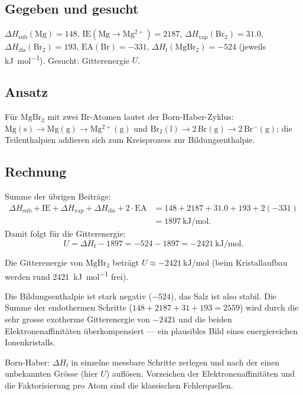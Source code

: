 
\subsection*{Gegeben und gesucht}
$\Delta H_{\mathrm{sub}}(\mathrm{Mg})=148$, $\mathrm{IE}(\mathrm{Mg\to Mg^{2+}})=2187$,
$\Delta H_{\mathrm{vap}}(\mathrm{Br_2})=31.0$, $\Delta H_{\mathrm{dis}}(\mathrm{Br_2})=193$,
$\mathrm{EA}(\mathrm{Br})=-331$, $\Delta H_{\mathrm f}(\mathrm{MgBr_2})=-524$
(jeweils \si{\kilo\joule\per\mol}). Gesucht: Gitterenergie $U$.

\subsection*{Ansatz}
Für $\mathrm{MgBr_2}$ mit zwei $\mathrm{Br}$-Atomen lautet der Born-Haber-Zyklus:
$\mathrm{Mg(s)}\to\mathrm{Mg(g)}\to\mathrm{Mg^{2+}(g)}$ und
$\mathrm{Br_2(l)}\to 2\,\mathrm{Br(g)}\to 2\,\mathrm{Br^-(g)}$; die Teilenthalpien
addieren sich zum Kreisprozess zur Bildungsenthalpie.

\subsection*{Rechnung}
Summe der übrigen Beiträge:
\begin{align*}
  \Delta H_{\mathrm{sub}}+\mathrm{IE}+\Delta H_{\mathrm{vap}}+\Delta H_{\mathrm{dis}}+2\cdot\mathrm{EA}
  &= 148+2187+31.0+193+2(-331)\\
  &= 1897\ \si{\kilo\joule\per\mol}.
\end{align*}
Damit folgt für die Gitterenergie:
\begin{equation}
  U = \Delta H_{\mathrm f} - 1897 = -524-1897 = -2421\ \si{\kilo\joule\per\mol}.
\end{equation}

\begin{ergebnis}
Die Gitterenergie von $\mathrm{MgBr_2}$ beträgt
$U \approx -2421\ \si{\kilo\joule\per\mol}$
(beim Kristallaufbau werden rund \qty{2421}{\kilo\joule\per\mol} frei).
\end{ergebnis}

\begin{kontrolle}
Die Bildungsenthalpie ist stark negativ ($-524$), das Salz ist also stabil.
Die Summe der endothermen Schritte ($148+2187+31+193=2559$) wird durch die sehr
grosse exotherme Gitterenergie von $-2421$ und die beiden Elektronenaffinitäten
überkompensiert --- ein plausibles Bild eines energiereichen Ionenkristalls.
\end{kontrolle}

\begin{merksatz}
Born-Haber: $\Delta H_{\mathrm f}$ in einzelne messbare Schritte zerlegen und
nach der einen unbekannten Grösse (hier $U$) auflösen. Vorzeichen der
Elektronenaffinitäten und die Faktorisierung pro Atom sind die klassischen Fehlerquellen.
\end{merksatz}
